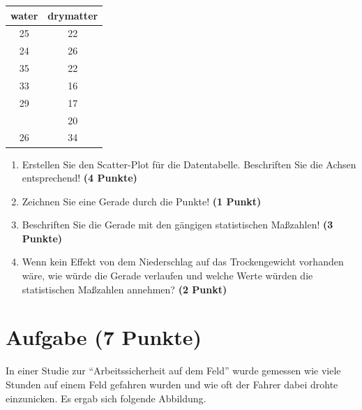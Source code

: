 \documentclass[a4paper, 10pt]{scrartcl}\usepackage[]{graphicx}\usepackage[]{color}
\begin{document}
\begin{table}[!h]
\centering
\begin{tabular}{cc}
\toprule
water & drymatter\\
\midrule
25 & 22\\
24 & 26\\
35 & 22\\
33 & 16\\
29 & 17\\
\addlinespace
28 & 20\\
26 & 34\\
\bottomrule
\end{tabular}
\end{table}



\begin{enumerate}
\item Erstellen Sie den Scatter-Plot f{\"u}r die Datentabelle. Beschriften Sie
  die Achsen entsprechend! \textbf{(4 Punkte)}
\item Zeichnen Sie eine Gerade durch die Punkte! \textbf{(1 Punkt)}
\item Beschriften Sie die Gerade mit den g{\"a}ngigen statistischen Ma{\ss}zahlen! \textbf{(3 Punkte)}
\item Wenn kein Effekt von dem Niederschlag auf das Trockengewicht
  vorhanden w{\"a}re, wie w{\"u}rde die Gerade verlaufen und welche Werte w{\"u}rden die
  statistischen Ma{\ss}zahlen annehmen? \textbf{(2 Punkt)}
\end{enumerate} 
\clearpage

\section{Aufgabe \hfill (7 Punkte)}

In einer Studie zur "`Arbeitssicherheit auf dem Feld"' wurde gemessen wie viele
Stunden auf einem Feld gefahren wurden und wie oft der Fahrer dabei drohte
einzunicken. Es ergab sich folgende Abbildung. 
\end{document}
